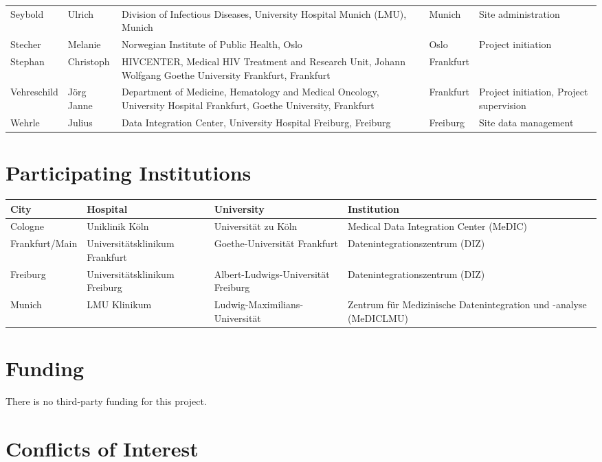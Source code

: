 \documentclass[
  letterpaper,
  DIV=11,
  numbers=noendperiod]{scrreprt}
\begin{document}
\begin{longtable*}{lllll}
Seybold & Ulrich & Division of Infectious Diseases, University Hospital Munich (LMU), Munich & Munich & Site administration \\ 
Stecher & Melanie & Norwegian Institute of Public Health, Oslo & Oslo & Project initiation \\ 
Stephan & Christoph & HIVCENTER, Medical HIV Treatment and Research Unit, Johann Wolfgang Goethe University Frankfurt, Frankfurt & Frankfurt &  \\ 
Vehreschild & Jörg Janne & Department of Medicine, Hematology and Medical Oncology, University Hospital Frankfurt, Goethe University, Frankfurt & Frankfurt & Project initiation, Project supervision \\ 
Wehrle & Julius & Data Integration Center, University Hospital Freiburg, Freiburg & Freiburg & Site data management \\ 
\bottomrule
\end{longtable*}

\hypertarget{participating-institutions}{%
\section{Participating Institutions}\label{participating-institutions}}

\begin{longtable*}{llll}
\toprule
City & Hospital & University & Institution \\ 
\midrule
Cologne & Uniklinik Köln & Universität zu Köln & Medical Data Integration Center (MeDIC) \\ 
Frankfurt/Main & Universitätsklinikum Frankfurt & Goethe-Universität Frankfurt & Datenintegrationszentrum (DIZ) \\ 
Freiburg & Universitätsklinikum Freiburg & Albert-Ludwigs-Universität Freiburg & Datenintegrationszentrum (DIZ) \\ 
Munich & LMU Klinikum & Ludwig-Maximilians-Universität & Zentrum für Medizinische Datenintegration und -analyse (MeDICLMU) \\ 
\bottomrule
\end{longtable*}

\hypertarget{funding}{%
\section{Funding}\label{funding}}

There is no third-party funding for this project.

\hypertarget{conflicts-of-interest}{%
\section{Conflicts of Interest}\label{conflicts-of-interest}}
\end{document}
